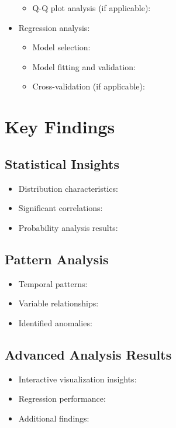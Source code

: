 \documentclass[10pt]{article}
\begin{document}
\begin{itemize}
    \begin{itemize}
        \item Q-Q plot analysis (if applicable):
    \end{itemize}
    \item Regression analysis:
    \begin{itemize}
        \item Model selection:
        \item Model fitting and validation:
        \item Cross-validation (if applicable):
    \end{itemize}
\end{itemize}

\section{Key Findings}

\subsection{Statistical Insights}
\begin{itemize}
    \item Distribution characteristics:
    \item Significant correlations:
    \item Probability analysis results:
\end{itemize}

\subsection{Pattern Analysis}
\begin{itemize}
    \item Temporal patterns:
    \item Variable relationships:
    \item Identified anomalies:
\end{itemize}

\subsection{Advanced Analysis Results}
\begin{itemize}
    \item Interactive visualization insights:
    \item Regression performance:
    \item Additional findings:
\end{itemize}
\end{document}
